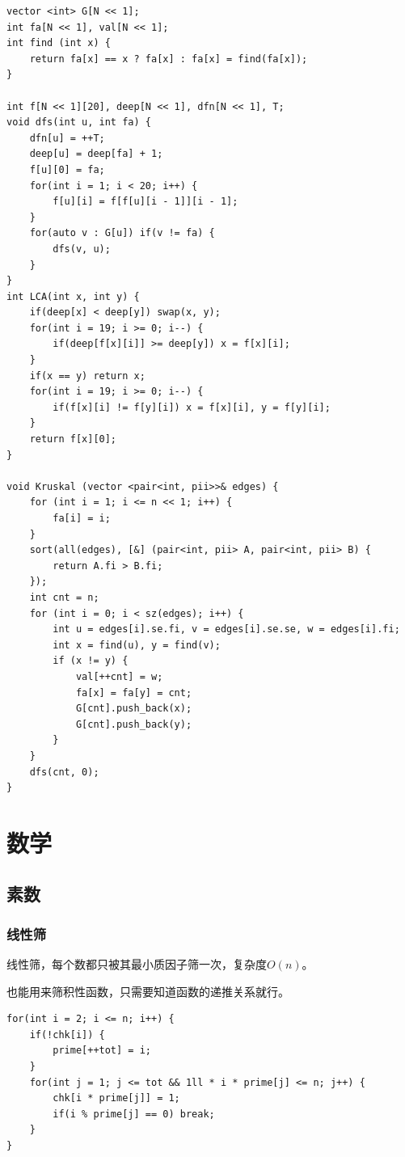 \documentclass[a4paper,11pt,twoside,fontset = fandol,UTF8]{ctexbook} %
\begin{document}
	\begin{lstlisting}
vector <int> G[N << 1];
int fa[N << 1], val[N << 1];
int find (int x) {
    return fa[x] == x ? fa[x] : fa[x] = find(fa[x]);   
}

int f[N << 1][20], deep[N << 1], dfn[N << 1], T;
void dfs(int u, int fa) {
    dfn[u] = ++T;
    deep[u] = deep[fa] + 1;
    f[u][0] = fa;
    for(int i = 1; i < 20; i++) {
        f[u][i] = f[f[u][i - 1]][i - 1];
    }   
    for(auto v : G[u]) if(v != fa) {
        dfs(v, u);
    }
}
int LCA(int x, int y) {
    if(deep[x] < deep[y]) swap(x, y);
    for(int i = 19; i >= 0; i--) {
        if(deep[f[x][i]] >= deep[y]) x = f[x][i];
    }  
    if(x == y) return x;
    for(int i = 19; i >= 0; i--) {
        if(f[x][i] != f[y][i]) x = f[x][i], y = f[y][i];  
    }
    return f[x][0];
}

void Kruskal (vector <pair<int, pii>>& edges) {
    for (int i = 1; i <= n << 1; i++) {
        fa[i] = i;   
    }
    sort(all(edges), [&] (pair<int, pii> A, pair<int, pii> B) {
        return A.fi > B.fi;        
    });
    int cnt = n;
    for (int i = 0; i < sz(edges); i++) {
        int u = edges[i].se.fi, v = edges[i].se.se, w = edges[i].fi;
        int x = find(u), y = find(v);
        if (x != y) {
            val[++cnt] = w;
            fa[x] = fa[y] = cnt;
            G[cnt].push_back(x);
            G[cnt].push_back(y);
        }
    }
    dfs(cnt, 0);   
}

	\end{lstlisting}
	\chapter{数学}
	\section{素数}
	\subsection{线性筛}
	线性筛，每个数都只被其最小质因子筛一次，复杂度$O(n)$。
	
	也能用来筛积性函数，只需要知道函数的递推关系就行。
	\begin{lstlisting}
for(int i = 2; i <= n; i++) {
    if(!chk[i]) {
        prime[++tot] = i;
    }
    for(int j = 1; j <= tot && 1ll * i * prime[j] <= n; j++) {
        chk[i * prime[j]] = 1;
        if(i % prime[j] == 0) break;
    }
}
	\end{lstlisting}
\end{document}
